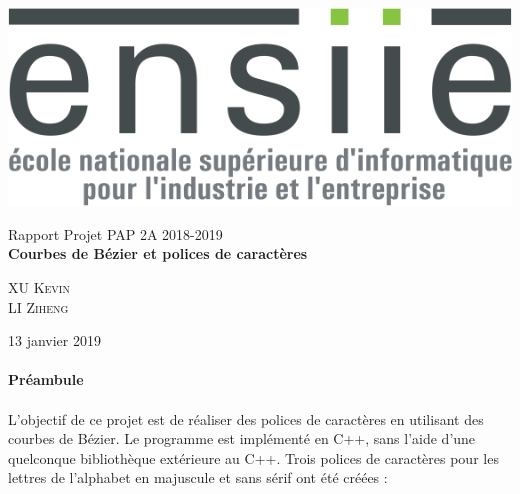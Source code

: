 \documentclass[a4paper, 12pt]{article}
\begin{document}
\begin{titlepage}
			\includegraphics[scale=0.25]{Images/logo_ENSIIE.png} 
			\begin{center}
				\vspace*{6cm}
				{ \huge Rapport Projet PAP 2A 2018-2019 \\ \vspace*{2cm}
				\textbf{Courbes de Bézier et polices de caractères} \\
				}
			\vspace*{2cm}
				\begin{center} \large
					\textsc{XU} \textsc{Kevin}\\
					\textsc{LI} \textsc{Ziheng}
				\end{center}
				\begin{minipage}{0.4\textwidth}
				\end{minipage}
				{\large 13 janvier 2019}
			\end{center}
	\end{titlepage}
	
	\renewcommand{\contentsname}{Sommaire} 
	{\setlength{\baselineskip}{1.2\baselineskip}
\tableofcontents\par} 
		
	\newpage
	\vspace*{3cm} 
	\paragraph{\Huge{Préambule}}

	\paragraph{}
	L'objectif de ce projet est de réaliser des polices de caractères en utilisant des courbes de Bézier. Le programme est implémenté en C++, sans l’aide d’une quelconque bibliothèque extérieure au C++.
	Trois polices de caractères pour les lettres de l’alphabet en majuscule et sans sérif ont été créées : 	
	
\end{document}
